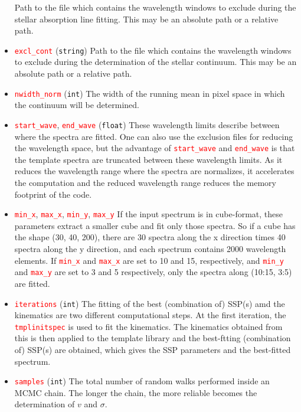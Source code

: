 \documentclass[usenatbib,usegraphicx,useAMS,onecolumn]{mn2e}
\newcommand{\codeline}[1]{\lstinline|#1|}
\newcommand{\paramdef}[1]{\textcolor{red}{\codeline{#1}}}
\begin{document}
\begin{itemize}
        Path to the file which contains the wavelength windows to exclude during the stellar absorption line fitting.
        This may be an absolute path or a relative path.
    \item \paramdef{excl_cont} (\texttt{string})
        Path to the file which contains the wavelength windows to exclude during the determination of the stellar continuum.
        This may be an absolute path or a relative path.
    \item \paramdef{nwidth_norm} (\texttt{int})
        The width of the running mean in pixel space in which the continuum will be determined.
    \item \paramdef{start_wave}, \paramdef{end_wave} (\texttt{float})
        These wavelength limits describe between where the spectra are fitted.
        One can also use the exclusion files for reducing the wavelength space, but the advantage of \paramdef{start_wave} and \paramdef{end_wave} is that the template spectra are truncated between these wavelength limits.
        As it reduces the wavelength range where the spectra are normalizes, it accelerates the computation and the reduced wavelength range reduces the memory footprint of the code.
    \item \paramdef{min_x}, \paramdef{max_x}, \paramdef{min_y}, \paramdef{max_y}
        If the input spectrum is in cube-format, these parameters extract a smaller cube and fit only those spectra.
        So if a cube has the shape (30, 40, 200), there are 30 spectra along the x direction times 40 spectra along the y direction, and each spectrum contains 2000 wavelength elements.
        If \paramdef{min_x} and \paramdef{max_x} are set to 10 and 15, respectively, and \paramdef{min_y} and \paramdef{max_y} are set to 3 and 5 respectively, only the spectra along (10:15, 3:5) are fitted.
    \item \paramdef{iterations} (\texttt{int})
        The fitting of the best (combination of) SSP(s) amd the kinematics are two different computational steps.
        At the first iteration, the \paramdef{tmplinitspec} is used to fit the kinematics.
        The kinematics obtained from this is then applied to the template library and the best-ftting (combination of) SSP(s) are obtained, which gives the SSP parameters and the best-fitted spectrum.
    \item \paramdef{samples} (\texttt{int})
        The total number of random walks performed inside an MCMC chain. 
        The longer the chain, the more reliable becomes the determination of $v$ and $\sigma$. 

\end{itemize}
\end{document}
